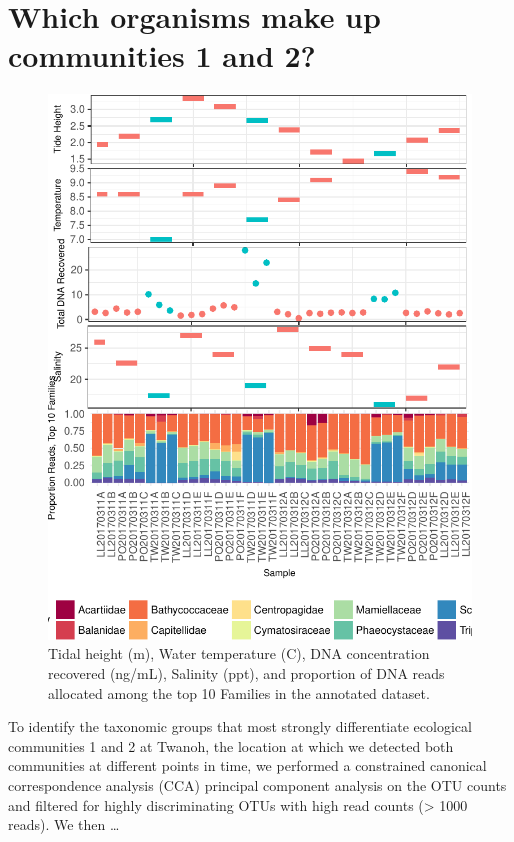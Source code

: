\documentclass[fleqn,10pt,lineno]{wlpeerj} %
\begin{document}
\section{Which organisms make up communities 1 and
2?}\label{which-organisms-make-up-communities-1-and-2}

\begin{figure}

{\centering \includegraphics{figures/multiplot_community_membership-1} 

}

\caption{\label{fig:fig5}Tidal height (m), Water temperature (C), DNA concentration recovered (ng/mL), Salinity (ppt), and proportion of DNA reads allocated among the top 10 Families in the annotated dataset.}\label{fig:multiplot_community_membership}
\end{figure}

To identify the taxonomic groups that most strongly differentiate
ecological communities 1 and 2 at Twanoh, the location at which we
detected both communities at different points in time, we performed a
constrained canonical correspondence analysis (CCA) principal component
analysis on the OTU counts and filtered for highly discriminating OTUs
with high read counts (\textgreater{} 1000 reads). We then \ldots{}
\end{document}
